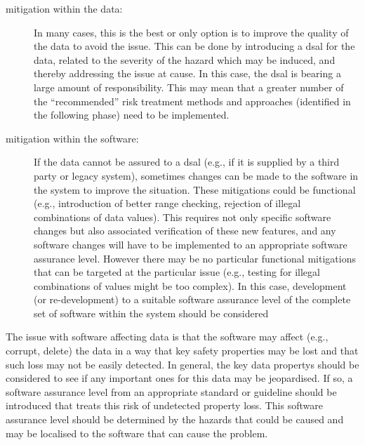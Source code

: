 \begin{description}
	\item[\Gls{mitigation} within the data:] In many cases, this is the best or only option is to improve the quality of the data to avoid the issue. This can be done by introducing a \gls{dsal} for the data, related to the severity of the \gls{hazard} which may be induced, and thereby addressing the issue at cause. In this case, the \gls{dsal} is bearing a large amount of responsibility. This may mean that a greater number of the ``recommended'' risk \gls{treatment} methods and approaches (identified in the following phase) need to be implemented.
	\item[\Gls{mitigation} within the software:] If the data cannot be assured to a \gls{dsal} (e.g., if it is supplied by a third party or legacy system), sometimes changes can be made to the software in the system to improve the situation. These \glspl{mitigation} could be functional (e.g., introduction of better range checking, rejection of illegal combinations of data values). This requires not only specific software changes but also associated \gls{verification} of these new features, and any software changes will have to be implemented to an appropriate \gls{software assurance level}. However there may be no particular functional \glspl{mitigation} that can be targeted at the particular issue (e.g., testing for illegal combinations of values might be too complex). In this case, development (or re-development) to a suitable \gls{software assurance level} of the complete set of software within the system should be considered
\end{description}

The issue with software affecting data is that the software may affect (e.g., corrupt, delete) the data in a way that key safety properties may be lost and that such loss may not be easily detected. In general, the key \glspl{data property} should be considered to see if any important ones for this data may be jeopardised. If so, a \gls{software assurance level} from an appropriate standard or guideline should be introduced that treats this risk of undetected property loss. This \gls{software assurance level} should be determined by the hazards that could be caused and may be localised to the software that can cause the problem.

